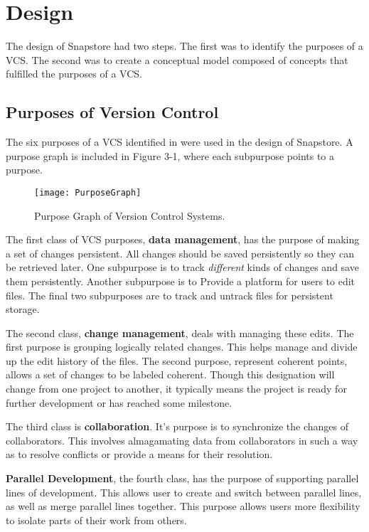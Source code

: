 \chapter{Design}

The design of Snapstore had two steps. The first was to identify the purposes of a VCS. The second was to create a conceptual model composed of concepts that fulfilled the purposes of a VCS.

\section{Purposes of Version Control}

The six purposes of a VCS identified in \cite{RossoJackson} were used in the design of Snapstore. A purpose graph is included in Figure 3-1, where each subpurpose points to a purpose.

\begin{figure}
\texttt{[image: PurposeGraph]}
\caption{Purpose Graph of Version Control Systems.}
\label{arm:fig1}
\end{figure}

The first class of VCS purposes, \textbf{data management}, has the purpose of making a set of changes persistent. All changes should be saved persistently so they can be retrieved later. One subpurpose is to track \textit{different} kinds of changes and save them persistently. Another subpurpose is to Provide a platform for users to edit files. The final two subpurposes are to track and untrack files for persistent storage.

The second class, \textbf{change management}, deals with managing these edits. The first purpose is grouping logically related changes. This helps manage and divide up the edit history of the files. The second purpose, represent coherent points, allows a set of changes to be labeled coherent. Though this designation will change from one project to another, it typically means the project is ready for further development or has reached some milestone. 

The third class is \textbf{collaboration}. It's purpose is to synchronize the changes of collaborators. This involves almagamating data from collaborators in such a way as to resolve conflicts or provide a means for their resolution.

\textbf{Parallel Development}, the fourth class, has the purpose of supporting parallel lines of development. This allows user to create and switch between parallel lines, as well as merge parallel lines together. This purpose allows users more flexibility to isolate parts of their work from others.

